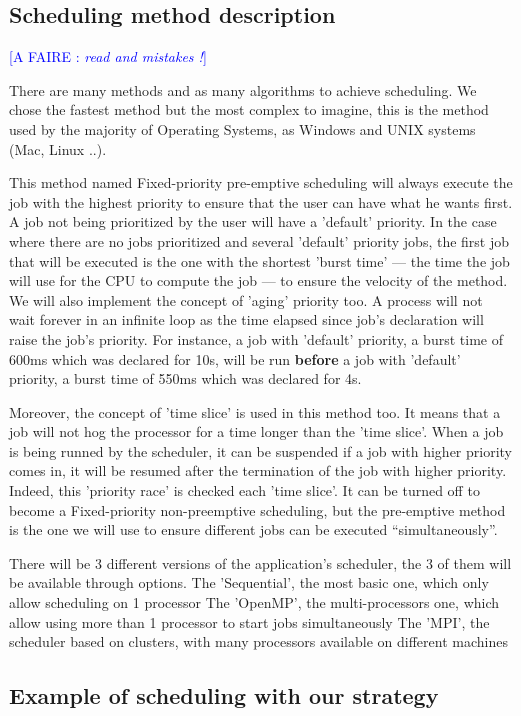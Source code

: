 \documentclass[a4paper,11pt]{article}
\newcommand*{\todo}[1]{\textcolor{blue}{[A FAIRE : \emph{#1}]}}
\begin{document}
\subsection{Scheduling method description}

\todo{read and mistakes !}

There are many methods and as many algorithms to achieve scheduling. We chose the fastest method but the most complex to imagine, this is the method used by the majority of Operating Systems, as Windows and UNIX systems (Mac, Linux ..).

This method named Fixed-priority pre-emptive scheduling will always execute the job with the highest priority to ensure that the user can have what he wants first. A job not being prioritized by the user will have a 'default' priority. 
In the case where there are no jobs prioritized and several 'default' priority jobs, the first job that will be executed is the one with the shortest 'burst time' --- the time the job will use for the CPU to compute the job --- to ensure the velocity of the method. 
We will also implement the concept of 'aging' priority too. A process will not wait forever in an infinite loop as the time elapsed since job's declaration will raise the job's priority. For instance, a job with 'default' priority, a burst time of 600ms which was declared for 10s, will be run \textbf{before} a job with 'default' priority, a burst time of 550ms which was declared for 4s.


Moreover, the concept of 'time slice' is used in this method too. It means that a job will not hog the processor for a time longer than the 'time slice'. When a job is being runned by the scheduler, it can be suspended if a job with higher priority comes in, it will be resumed after the termination of the job with higher priority. Indeed, this 'priority race' is checked each 'time slice'. It can be turned off to become a Fixed-priority non-preemptive scheduling, but the pre-emptive method is the one we will use to ensure different jobs can be executed “simultaneously”.


There will be 3 different versions of the application's scheduler, the 3 of them will be available through options.
The 'Sequential', the most basic one, which only allow scheduling on 1 processor
The 'OpenMP', the multi-processors one, which allow using more than 1 processor to start jobs simultaneously
The 'MPI', the scheduler based on clusters, with many processors available on different machines


\subsection{Example of scheduling with our strategy}
\end{document}
